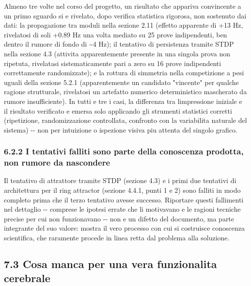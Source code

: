 \documentclass[
  italian,
]{article}
\begin{document}
Almeno tre volte nel corso del progetto, un risultato che appariva convincente a un primo sguardo si e\textquotesingle{} rivelato, dopo verifica statistica rigorosa, non sostenuto dai dati: la propagazione tra moduli nella sezione 2.11 (effetto apparente di +13 Hz, rivelatosi di soli +0.89 Hz una volta mediato su 25 prove indipendenti, ben dentro il rumore di fondo di \textasciitilde4 Hz); il tentativo di persistenza tramite STDP nella sezione 4.3 (attivita\textquotesingle{} apparentemente presente in una singola prova non ripetuta, rivelatasi sistematicamente pari a zero su 16 prove indipendenti correttamente randomizzate); e la rottura di simmetria nella competizione a pesi uguali della sezione 5.2.1 (apparentemente un candidato "vincente" per qualche ragione strutturale, rivelatosi un artefatto numerico deterministico mascherato da rumore insufficiente). In tutti e tre i casi, la differenza tra l\textquotesingle impressione iniziale e il risultato verificato e\textquotesingle{} emersa solo applicando gli strumenti statistici corretti (ripetizione, randomizzazione controllata, confronto con la variabilita\textquotesingle{} naturale del sistema) -\/- non per intuizione o ispezione visiva piu\textquotesingle{} attenta del singolo grafico.

\subsubsection{6.2.2 I tentativi falliti sono parte della conoscenza prodotta, non rumore da nascondere}\label{i-tentativi-falliti-sono-parte-della-conoscenza-prodotta-non-rumore-da-nascondere}

Il tentativo di attrattore tramite STDP (sezione 4.3) e i primi due tentativi di architettura per il ring attractor (sezione 4.4.1, punti 1 e 2) sono falliti in modo completo prima che il terzo tentativo avesse successo. Riportare questi fallimenti nel dettaglio -\/- comprese le ipotesi errate che li motivavano e le ragioni tecniche precise per cui non funzionavano -\/- non e\textquotesingle{} un difetto del documento, ma parte integrante del suo valore: mostra il vero processo con cui si costruisce conoscenza scientifica, che raramente procede in linea retta dal problema alla soluzione.

\subsection{7.3 Cosa manca per una vera funzionalita\textquotesingle{} cerebrale}\label{cosa-manca-per-una-vera-funzionalita-cerebrale}
\end{document}
